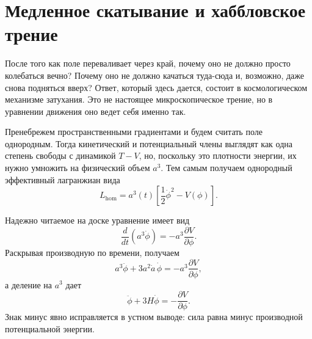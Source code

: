 \begin{classroomqa}
\end{classroomqa}

\begin{classroomqa}
\end{classroomqa}

\section{Медленное скатывание и хаббловское трение}

После того как поле переваливает через край, почему оно не должно просто колебаться вечно? Почему оно не должно качаться туда-сюда и, возможно, даже снова подняться вверх? Ответ, который здесь дается, состоит в космологическом механизме затухания. Это не настоящее микроскопическое трение, но в уравнении движения оно ведет себя именно так.

Пренебрежем пространственными градиентами и будем считать поле однородным. Тогда кинетический и потенциальный члены выглядят как одна степень свободы с динамикой \(T-V\), но, поскольку это плотности энергии, их нужно умножить на физический объем \(a^3\). Тем самым получаем однородный эффективный лагранжиан вида
\begin{equation}
L_{\mathrm{hom}}=a^3(t)\left[\frac12\dot\phi^2-V(\phi)\right].
\end{equation}

Надежно читаемое на доске уравнение имеет вид
\begin{equation}
\frac{d}{dt}\left(a^3\dot\phi\right)=-a^3\frac{\partial V}{\partial\phi}.
\end{equation}
Раскрывая производную по времени, получаем
\begin{equation}
a^3\ddot\phi+3a^2\dot a\,\dot\phi=-a^3\frac{\partial V}{\partial\phi},
\end{equation}
а деление на \(a^3\) дает
\begin{equation}
\ddot\phi+3H\dot\phi=-\frac{\partial V}{\partial\phi}.
\end{equation}
Знак минус явно исправляется в устном выводе: сила равна минус производной потенциальной энергии.

